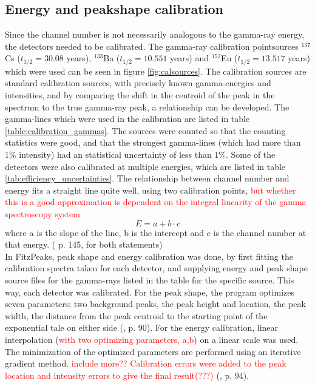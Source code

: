\subsection{Energy and peakshape calibration}  \label{subsec:energy_peakshape_calibration}
Since the channel number is not necessarily analogous to the gamma-ray energy, the detectors needed to be calibrated. The gamma-ray calibration pointsources  $^{137}$Cs ($t_{1/2}=30.08$ years\cite{Browne2007}), $^{133}$Ba ($t_{1/2}=10.551$ years\cite{Khazov2011}) and $^{152}$Eu ($t_{1/2}=13.517$ years\cite{Martin2013}) which were used can be seen in figure \ref{fig:calsources}. The calibration sources are standard calibration sources, with precisely known gamma-energies and intensities, and by comparing the shift in the centroid of the peak in the spectrum to the true gamma-ray peak, a relationship can be developed. The gamma-lines which were used in the calibration are listed in table \ref{table:calibration_gammas}. The sources were counted so that the counting statistics were good, and that the strongest gamma-lines (which had more than 1\% intensity) had an statistical uncertainty of less than 1\%. Some of the detectors were also calibrated at multiple energies, which are listed in table \ref{tab:efficiency_uncertainties}. The relationship between channel number and energy fits a straight line quite well, using two calibration points, \textcolor{red}{but whether this is a good approximation is dependent on the integral linearity of the gamma spectroscopy system} 
\begin{equation}
    E = a+b\cdot c
\end{equation}
where a is the slope of the line, b is the intercept and c is the channel number at that energy. 
(\cite{Gilmore2008} p. 145, for both statements) \\

In FitzPeaks, peak shape and energy calibration was done, by first fitting the calibration spectra taken for each detector, and  supplying energy and peak shape source files for the gamma-rays listed in the table for the specific source. This way, each detector was calibrated. For the peak shape, the program optimizes seven parameters; two background peaks, the peak height and location, the peak width, the distance from the peak centroid to the starting point of the exponential tale on either side (\cite{Koskelo1981}, p. 90). 
For the energy calibration, linear interpolation (\textcolor{red}{with two optimizing parameters, a,b}) on a linear scale was used. The minimization of the optimized parameters are performed using an iterative gradient method. \textcolor{red}{include more??} \textcolor{red}{ Calibration errors were added to the peak location and intensity errors to give the final result(???)} (\cite{Koskelo1981}, p. 94). 

